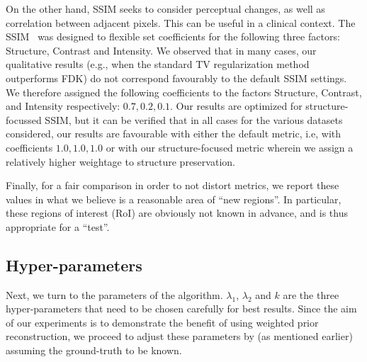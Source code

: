 \documentclass[journal]{IEEEtran}
\begin{document}
On the other hand, SSIM seeks to consider perceptual changes, as well
as correlation between adjacent pixels. This can be useful in a
clinical context. The SSIM~\cite{multiscale_ssim} was designed to
flexible set coefficients for the following three factors: Structure,
Contrast and Intensity. We observed that in many cases, our
qualitative results (e.g., when the standard TV regularization method
outperforms FDK) do not correspond favourably to the default SSIM settings.  We
therefore assigned the following coefficients to the factors
Structure, Contrast, and Intensity respectively: $0.7,0.2,0.1$. Our
results are optimized for structure-focussed SSIM, but it can be
verified that in all cases for the various datasets considered, our
results are favourable with either the default metric, i.e, with
coefficients $1.0,1.0,1.0$ or with our structure-focused metric
wherein we assign a relatively higher weightage to structure
preservation.


Finally, for a fair comparison in order to not distort metrics,
we report these values in what we believe is a reasonable area of
``new regions''. In particular, these regions of interest (RoI) are
obviously not known in advance, and is thus appropriate for a ``test''.


\subsection{Hyper-parameters}
\label{sec:tuning_parameters}

Next, we turn to the parameters of the algorithm.  $\lambda_1$,
$\lambda_2$ and $k$ are the three hyper-parameters that need to be
chosen carefully for best results. Since the aim of our experiments is
to demonstrate the benefit of using weighted prior reconstruction, we
proceed to adjust these parameters by (as mentioned earlier) assuming
the ground-truth to be known.
\end{document}
